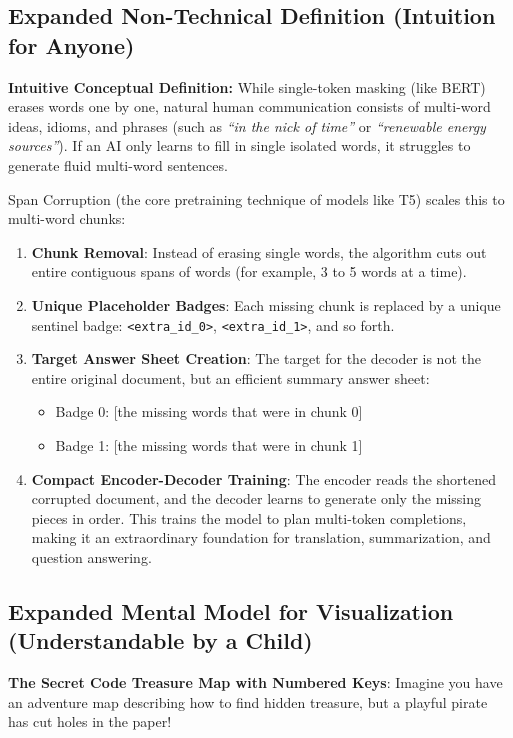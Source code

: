 \documentclass[11pt,a4paper]{article}
\theoremstyle{definition}
\begin{document}
\subsection{Expanded Non-Technical Definition (Intuition for Anyone)}
\textbf{Intuitive Conceptual Definition:}
While single-token masking (like BERT) erases words one by one, natural human communication consists of multi-word ideas, idioms, and phrases (such as \emph{``in the nick of time''} or \emph{``renewable energy sources''}). If an AI only learns to fill in single isolated words, it struggles to generate fluid multi-word sentences.

Span Corruption (the core pretraining technique of models like T5) scales this to multi-word chunks:
\begin{enumerate}
    \item \textbf{Chunk Removal}: Instead of erasing single words, the algorithm cuts out entire contiguous spans of words (for example, 3 to 5 words at a time).
    \item \textbf{Unique Placeholder Badges}: Each missing chunk is replaced by a unique sentinel badge: \texttt{<extra\_id\_0>}, \texttt{<extra\_id\_1>}, and so forth.
    \item \textbf{Target Answer Sheet Creation}: The target for the decoder is not the entire original document, but an efficient summary answer sheet:
    \begin{itemize}
        \item Badge 0: [the missing words that were in chunk 0]
        \item Badge 1: [the missing words that were in chunk 1]
    \end{itemize}
    \item \textbf{Compact Encoder-Decoder Training}: The encoder reads the shortened corrupted document, and the decoder learns to generate only the missing pieces in order. This trains the model to plan multi-token completions, making it an extraordinary foundation for translation, summarization, and question answering.
\end{enumerate}

\subsection{Expanded Mental Model for Visualization (Understandable by a Child)}
\textbf{The Secret Code Treasure Map with Numbered Keys}:
Imagine you have an adventure map describing how to find hidden treasure, but a playful pirate has cut holes in the paper!
\end{document}

